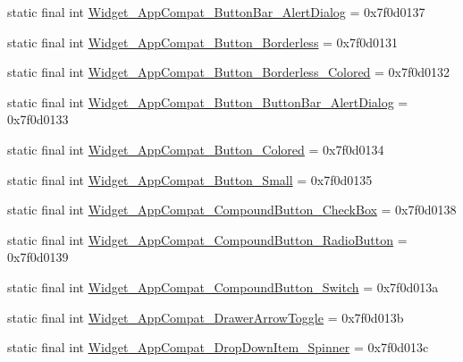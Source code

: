 \begin{DoxyCompactItemize}
\item 
static final int \mbox{\hyperlink{classandroid_1_1support_1_1v7_1_1appcompat_1_1_r_1_1style_ae01cc979ac39252c299ba937499caab5}{Widget\+\_\+\+App\+Compat\+\_\+\+Button\+Bar\+\_\+\+Alert\+Dialog}} = 0x7f0d0137
\item 
static final int \mbox{\hyperlink{classandroid_1_1support_1_1v7_1_1appcompat_1_1_r_1_1style_a5539248d2625f20d83f4a1f93cc576b2}{Widget\+\_\+\+App\+Compat\+\_\+\+Button\+\_\+\+Borderless}} = 0x7f0d0131
\item 
static final int \mbox{\hyperlink{classandroid_1_1support_1_1v7_1_1appcompat_1_1_r_1_1style_a610a30199ff6d78914f732725e62f88d}{Widget\+\_\+\+App\+Compat\+\_\+\+Button\+\_\+\+Borderless\+\_\+\+Colored}} = 0x7f0d0132
\item 
static final int \mbox{\hyperlink{classandroid_1_1support_1_1v7_1_1appcompat_1_1_r_1_1style_a9caf7ffbeb017b5b7c700450aeb0e09f}{Widget\+\_\+\+App\+Compat\+\_\+\+Button\+\_\+\+Button\+Bar\+\_\+\+Alert\+Dialog}} = 0x7f0d0133
\item 
static final int \mbox{\hyperlink{classandroid_1_1support_1_1v7_1_1appcompat_1_1_r_1_1style_aa5cdb819e242c5005d54d0431f3e9d60}{Widget\+\_\+\+App\+Compat\+\_\+\+Button\+\_\+\+Colored}} = 0x7f0d0134
\item 
static final int \mbox{\hyperlink{classandroid_1_1support_1_1v7_1_1appcompat_1_1_r_1_1style_a021c9d5ac246c4c6c0cc59f83d925439}{Widget\+\_\+\+App\+Compat\+\_\+\+Button\+\_\+\+Small}} = 0x7f0d0135
\item 
static final int \mbox{\hyperlink{classandroid_1_1support_1_1v7_1_1appcompat_1_1_r_1_1style_a816734eecf98d5be30371c10bbdebcaf}{Widget\+\_\+\+App\+Compat\+\_\+\+Compound\+Button\+\_\+\+Check\+Box}} = 0x7f0d0138
\item 
static final int \mbox{\hyperlink{classandroid_1_1support_1_1v7_1_1appcompat_1_1_r_1_1style_a84b6c8ceee6e9b5a6314f7869f841202}{Widget\+\_\+\+App\+Compat\+\_\+\+Compound\+Button\+\_\+\+Radio\+Button}} = 0x7f0d0139
\item 
static final int \mbox{\hyperlink{classandroid_1_1support_1_1v7_1_1appcompat_1_1_r_1_1style_a9edca8cda8d4a4ec1a52c2e61195d1cd}{Widget\+\_\+\+App\+Compat\+\_\+\+Compound\+Button\+\_\+\+Switch}} = 0x7f0d013a
\item 
static final int \mbox{\hyperlink{classandroid_1_1support_1_1v7_1_1appcompat_1_1_r_1_1style_a3414cd0dee8049b32bc8ffaf55ed8808}{Widget\+\_\+\+App\+Compat\+\_\+\+Drawer\+Arrow\+Toggle}} = 0x7f0d013b
\item 
static final int \mbox{\hyperlink{classandroid_1_1support_1_1v7_1_1appcompat_1_1_r_1_1style_ac00c6268b87ac497649f5ad831be1f99}{Widget\+\_\+\+App\+Compat\+\_\+\+Drop\+Down\+Item\+\_\+\+Spinner}} = 0x7f0d013c

\end{DoxyCompactItemize}
